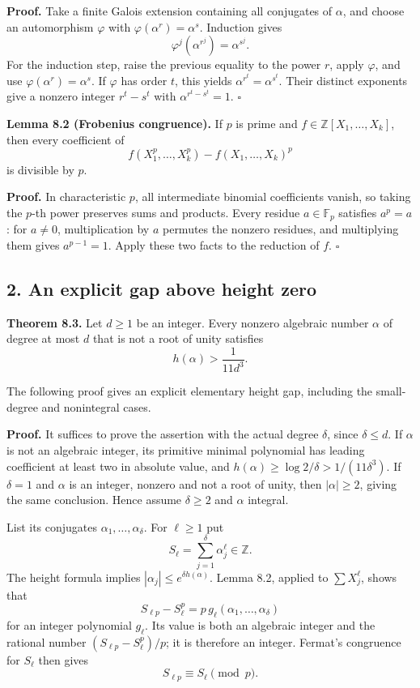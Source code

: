 \documentclass[
  11pt,
  a4paper,
]{article}
\begin{document}
\textbf{Proof.} Take a finite Galois extension containing all conjugates
of \(\alpha\), and choose an automorphism \(\varphi\) with
\(\varphi(\alpha^r)=\alpha^s\). Induction gives \[
\varphi^j(\alpha^{r^j})=\alpha^{s^j}.
\] For the induction step, raise the previous equality to the power
\(r\), apply \(\varphi\), and use \(\varphi(\alpha^r)=\alpha^s\). If
\(\varphi\) has order \(t\), this yields \(\alpha^{r^t}=\alpha^{s^t}\).
Their distinct exponents give a nonzero integer \(r^t-s^t\) with
\(\alpha^{r^t-s^t}=1\). \(\square\)

\textbf{Lemma 8.2 (Frobenius congruence).} If \(p\) is prime and
\(f\in\mathbb Z[X_1,\ldots,X_k]\), then every coefficient of \[
f(X_1^p,\ldots,X_k^p)-f(X_1,\ldots,X_k)^p
\] is divisible by \(p\).

\textbf{Proof.} In characteristic \(p\), all intermediate binomial
coefficients vanish, so taking the \(p\)-th power preserves sums and
products. Every residue \(a\in\mathbb F_p\) satisfies \(a^p=a\): for
\(a\ne0\), multiplication by \(a\) permutes the nonzero residues, and
multiplying them gives \(a^{p-1}=1\). Apply these two facts to the
reduction of \(f\). \(\square\)

\subsection{2. An explicit gap above height
zero}\label{an-explicit-gap-above-height-zero}

\textbf{Theorem 8.3.} Let \(d\ge1\) be an integer. Every nonzero
algebraic number \(\alpha\) of degree at most \(d\) that is not a root
of unity satisfies \[
h(\alpha)>\frac1{11d^3}. \tag{8.1}
\]

The following proof gives an explicit elementary height gap, including
the small-degree and nonintegral cases.

\textbf{Proof.} It suffices to prove the assertion with the actual
degree \(\delta\), since \(\delta\le d\). If \(\alpha\) is not an
algebraic integer, its primitive minimal polynomial has leading
coefficient at least two in absolute value, and
\(h(\alpha)\ge\log2/\delta>1/(11\delta^3)\). If \(\delta=1\) and
\(\alpha\) is an integer, nonzero and not a root of unity, then
\(|\alpha|\ge2\), giving the same conclusion. Hence assume
\(\delta\ge2\) and \(\alpha\) integral.

List its conjugates \(\alpha_1,\ldots,\alpha_\delta\). For \(\ell\ge1\)
put \[
S_\ell=\sum_{j=1}^{\delta}\alpha_j^\ell\in\mathbb Z.
\] The height formula implies \(|\alpha_j|\le e^{\delta h(\alpha)}\).
Lemma 8.2, applied to \(\sum X_j^\ell\), shows that \[
S_{\ell p}-S_\ell^p=p\,g_\ell(\alpha_1,\ldots,\alpha_\delta)
\] for an integer polynomial \(g_\ell\). Its value is both an algebraic
integer and the rational number \((S_{\ell p}-S_\ell^p)/p\); it is
therefore an integer. Fermat's congruence for \(S_\ell\) then gives \[
S_{\ell p}\equiv S_\ell\pmod p. \tag{8.2}
\]
\end{document}
